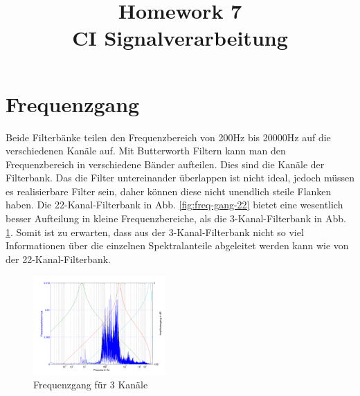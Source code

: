 \documentclass[conference]{IEEEtran}
\begin{document}
%
%
\title{Homework 7\\ CI Signalverarbeitung}

\author{
}


\maketitle

\IEEEpeerreviewmaketitle

\section{Frequenzgang}
Beide Filterbänke teilen den Frequenzbereich von 200Hz bis 20000Hz auf die verschiedenen Kanäle auf. Mit Butterworth Filtern kann man den Frequenzbereich in verschiedene Bänder aufteilen. Dies sind die Kanäle der Filterbank. Das die Filter untereinander überlappen ist nicht ideal, jedoch müssen es realisierbare Filter sein, daher können diese nicht unendlich steile Flanken haben. Die 22-Kanal-Filterbank in Abb. \ref{fig:freq-gang-22} bietet eine wesentlich besser Aufteilung in kleine Frequenzbereiche, als die 3-Kanal-Filterbank in Abb. \ref{fig:freq-gang-3}. Somit ist zu erwarten, dass aus der 3-Kanal-Filterbank nicht so viel Informationen über die einzelnen Spektralanteile abgeleitet werden kann wie von der 22-Kanal-Filterbank.
\begin{figure}[h]
	\vspace{-5pt}
	\centering
	\includegraphics[width=0.45\textwidth]{img/freq_gang_3.png}
	\vspace{-10pt}
	\caption{Frequenzgang für 3 Kanäle}
	\vspace{-20pt}
	\label{fig:freq-gang-3}
\end{figure}
\end{document}
